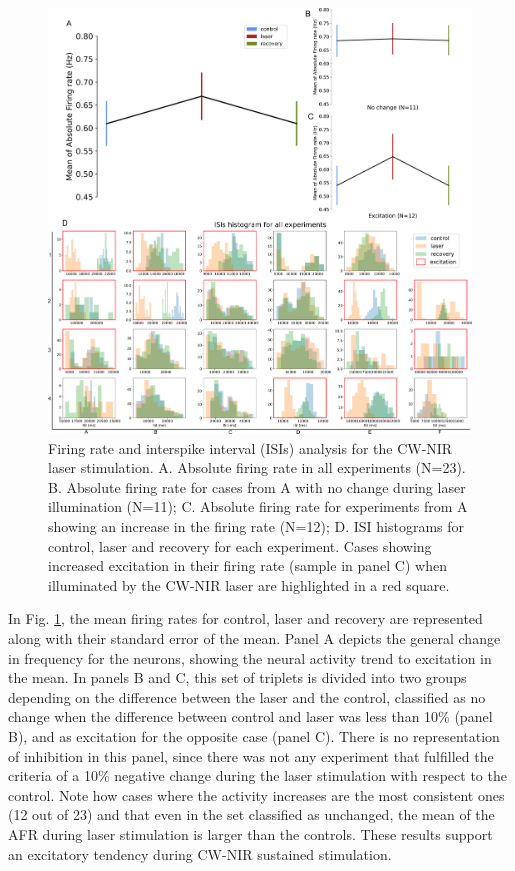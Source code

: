 \begin{figure}[hb!]
	\centering
	\includegraphics[width=\textwidth]{img/laser/Figure3.pdf}
	\caption{Firing rate and interspike interval (ISIs) analysis for the CW-NIR laser stimulation. A. Absolute firing rate in all experiments (N=23). B. Absolute firing rate for cases from A with no change during laser illumination (N=11); C. Absolute firing rate for experiments from A showing an increase in the firing rate (N=12); D. ISI histograms for control, laser and recovery for each experiment. Cases showing increased excitation in their firing rate (sample in panel C) when illuminated by the CW-NIR laser are highlighted in a red square.}
	\label{fig:frequency FR}
\end{figure}

In Fig. \ref{fig:frequency FR}, the mean firing rates for control, laser and recovery are represented along with their standard error of the mean. Panel A depicts the general change in frequency for the neurons, showing the neural activity trend to excitation in the mean. In panels B and C, this set of triplets is divided into two groups depending on the difference between the laser and the control, classified as no change when the difference between control and laser was less than 10\% (panel B), and as excitation for the opposite case (panel C). There is no representation of inhibition in this panel, since there was not any experiment that fulfilled the criteria of a 10\% negative change during the laser stimulation with respect to the control. Note how cases where the activity increases are the most consistent ones (12 out of 23) and that even in the set classified as unchanged, the mean of the AFR during laser stimulation is larger than the controls. These results support an excitatory tendency during CW-NIR sustained stimulation.

